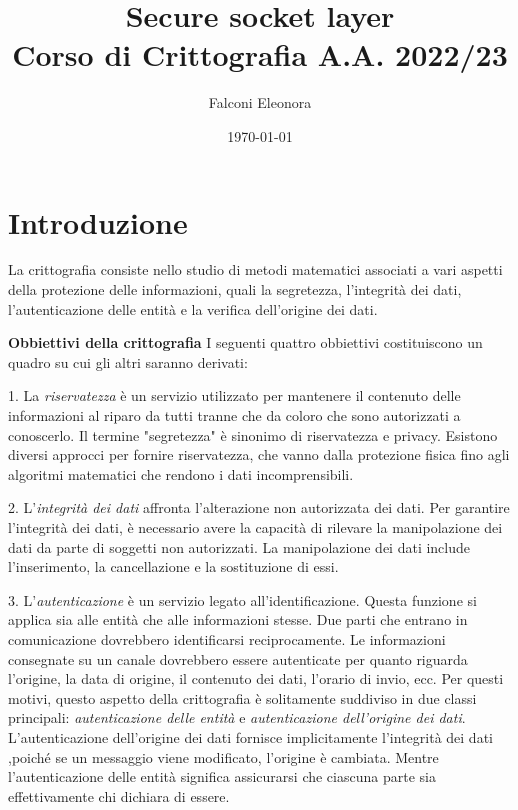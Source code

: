 \documentclass{article}
\title{Secure socket layer \\
        \large
        Corso di Crittografia A.A. 2022/23}
\author{Falconi Eleonora}
\date{\today}
\theoremstyle{definition}
\begin{document}
\maketitle
\clearpage
\tableofcontents
\clearpage



\section{Introduzione}

La crittografia consiste nello studio di metodi matematici associati a vari aspetti della protezione delle informazioni, quali la segretezza, l'integrità dei dati, l'autenticazione delle entità e la verifica dell'origine dei dati.

\textbf{Obbiettivi della crittografia} %
I seguenti quattro obbiettivi costituiscono un quadro su cui gli altri saranno derivati: 

1. La \textit{riservatezza } è un servizio utilizzato per mantenere il contenuto delle informazioni al riparo da tutti tranne che da coloro che sono autorizzati a conoscerlo. Il termine "segretezza" è sinonimo di riservatezza e privacy. Esistono diversi approcci per fornire riservatezza, che vanno dalla protezione fisica fino agli algoritmi matematici che rendono i dati incomprensibili.

2. L'\textit{integrità dei dati} affronta l'alterazione non autorizzata dei dati. Per garantire l'integrità dei dati, è necessario avere la capacità di rilevare la manipolazione dei dati da parte di soggetti non autorizzati. La manipolazione dei dati include l'inserimento, la cancellazione e la sostituzione di essi.

3. L'\textit{autenticazione} è un servizio legato all'identificazione. Questa funzione si applica sia alle entità che alle informazioni stesse. Due parti che entrano in comunicazione dovrebbero identificarsi reciprocamente. Le informazioni consegnate su un canale dovrebbero essere autenticate per quanto riguarda l'origine, la data di origine, il contenuto dei dati, l'orario di invio, ecc. Per questi motivi, questo aspetto della crittografia è solitamente suddiviso in due classi principali: \textit{autenticazione delle entità} e \textit{autenticazione dell'origine dei dati}. L'autenticazione dell'origine dei dati fornisce implicitamente l'integrità dei dati ,poiché se un messaggio viene modificato, l'origine è cambiata. Mentre l'autenticazione delle entità significa assicurarsi che ciascuna parte sia effettivamente chi dichiara di essere.
\end{document}
